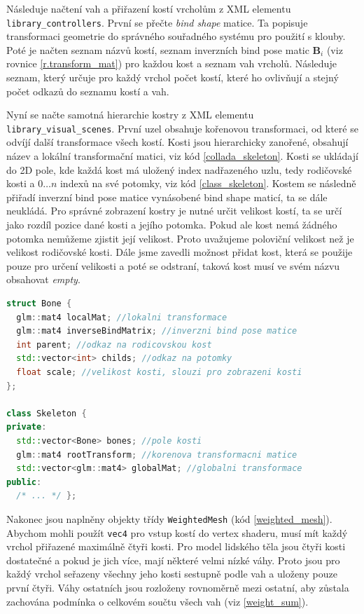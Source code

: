 Následuje načtení vah a přiřazení kostí vrcholům z XML elementu  \texttt{library\_controllers}. První se přečte \textit{bind shape} matice. Ta popisuje transformaci geometrie do správného souřadného systému pro použití s klouby. Poté je načten seznam názvů kostí, seznam inverzních bind pose matic $\mathbf{B}_i$ (viz rovnice \ref{r.transform_mat}) pro každou kost a seznam vah vrcholů. Následuje seznam, který určuje pro každý vrchol počet kostí, které ho ovlivňují a stejný počet odkazů do seznamu kostí a vah.

Nyní se načte samotná hierarchie kostry z XML elementu \texttt{library\_visual\_scenes}. První uzel obsahuje kořenovou transformaci, od které se odvíjí další transformace všech kostí. Kosti jsou hierarchicky zanořené, obsahují název a lokální transformační matici, viz kód \ref{collada_skeleton}. Kosti se ukládají do 2D pole, kde každá kost má uložený index nadřazeného uzlu, tedy rodičovské kosti a $0 \dots n$ indexů na své potomky, viz kód \ref{class_skeleton}. Kostem se následně přiřadí inverzní bind pose matice vynásobené bind shape maticí, ta se dále neukládá. Pro správné zobrazení kostry je nutné určit velikost kostí, ta se určí jako rozdíl pozice dané kosti a jejího potomka. Pokud ale kost nemá žádného potomka nemůžeme zjistit její velikost. Proto uvažujeme poloviční velikost než je velikost rodičovské kosti. Dále jsme zavedli možnost přidat kost, která se použije pouze pro určení velikosti a poté se odstraní, taková kost musí ve svém názvu obsahovat \textit{empty}.

\begin{lstlisting}[float,floatplacement=H,language=C++, caption={Třída kostry.}, label={class_skeleton}
]
struct Bone {
  glm::mat4 localMat; //lokalni transformace
  glm::mat4 inverseBindMatrix; //inverzni bind pose matice
  int parent; //odkaz na rodicovskou kost
  std::vector<int> childs; //odkaz na potomky
  float scale; //velikost kosti, slouzi pro zobrazeni kosti 
};

class Skeleton {
private:
  std::vector<Bone> bones; //pole kosti
  glm::mat4 rootTransform; //korenova transformacni matice
  std::vector<glm::mat4> globalMat; //globalni transformace
public:
  /* ... */ };
\end{lstlisting}

Nakonec jsou naplněny objekty třídy \texttt{WeightedMesh} (kód \ref{weighted_mesh}). Abychom mohli použít \texttt{vec4} pro vstup kostí do vertex shaderu, musí mít každý vrchol přiřazené maximálně čtyři kosti. Pro model lidského těla jsou čtyři kosti dostatečné a pokud je jich více, mají některé velmi nízké váhy. Proto jsou pro každý vrchol seřazeny všechny jeho kosti sestupně podle vah a uloženy pouze první čtyři. Váhy ostatních jsou rozloženy rovnoměrně mezi ostatní, aby zůstala zachována podmínka o celkovém součtu všech vah (viz \ref{weight_sum}).

